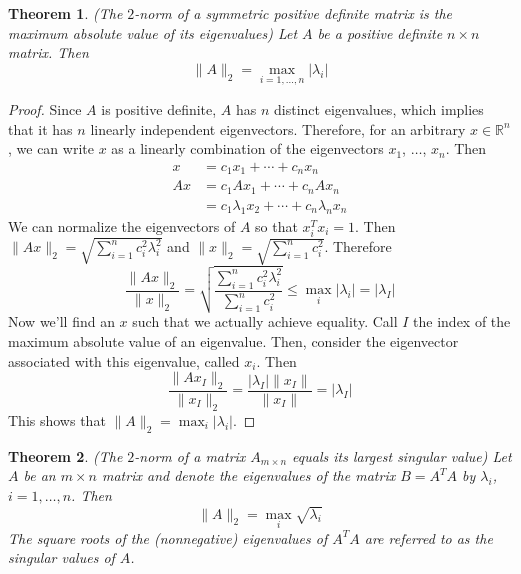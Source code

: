 \documentclass[12pt]{article}
\newtheorem{theorem}{Theorem}
\theoremstyle{definition}
\newcommand{\R}{\mathbb{R}}
\newcommand{\norm}[1]{\lVert#1\rVert}
\begin{document}
\begin{theorem}(The $2$-norm of a symmetric positive definite matrix is the maximum absolute value of its eigenvalues)
Let $A$ be a positive definite $n \times n$ matrix. Then 
\begin{equation}
	\norm{A}_2 = \max_{i=1,\ldots, n} |\lambda_i|
\end{equation}
\end{theorem}
\begin{proof}
Since $A$ is positive definite, $A$ has $n$ distinct eigenvalues, which implies that it has $n$ linearly independent eigenvectors. Therefore, for an arbitrary $x \in \R^n$, we can write $x$ as a linearly combination of the eigenvectors $x_1$, $\ldots$, $x_n$. Then
\begin{align*}
	x &= c_1 x_1 + \cdots + c_n x_n \\
	A x &= c_1 A x_1 + \cdots + c_n A x_n \\
	&= c_1 \lambda_1 x_2 + \cdots + c_n \lambda_n x_n 
\end{align*}
We can normalize the eigenvectors of $A$ so that $x_i^T x_i = 1$. Then $\norm{Ax}_2 = \sqrt{\sum_{i=1}^n c_i^2 \lambda_i^2}$ and $\norm{x}_2 = \sqrt{\sum_{i=1}^n c_i^2}$. Therefore 
\begin{equation}
	\frac{\norm{Ax}_2}{\norm{x}_2} = \sqrt{\frac{\sum_{i=1}^n c_i^2 \lambda_i^2}{\sum_{i=1}^n c_i^2}} \leq \max_i |\lambda_i| = |\lambda_I|
\end{equation}
Now we'll find an $x$ such that we actually achieve equality. Call $I$ the index of the maximum absolute value of an eigenvalue. Then, consider the eigenvector associated with this eigenvalue, called $x_i$. Then
\begin{equation}
	\frac{\norm{Ax_I}_2}{\norm{x_I}_2} = \frac{|\lambda_I|\norm{x_I}}{\norm{x_I}} = |\lambda_I|
\end{equation}
This shows that $\norm{A}_2 =  \max_i |\lambda_i|$.
\end{proof}

\begin{theorem}(The $2$-norm of a matrix $A_{m \times n}$ equals its largest singular value)
Let $A$ be an $m \times n$ matrix and denote the eigenvalues of the matrix $B = A^TA$ by $\lambda_i$, $i=1,\ldots, n$. Then 
\begin{equation}
	\norm{A}_2 = \max_i \sqrt{\lambda_i}
\end{equation}
The square roots of the (nonnegative) eigenvalues of $A^TA$ are referred to as the singular values of $A$.
\end{theorem}
\end{document}
